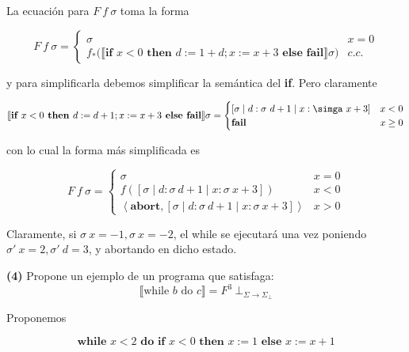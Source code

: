 \documentclass[a4paper, 12pt]{article}
\begin{document}
La ecuación para $F ~ f ~ \sigma$ toma la forma 

\begin{equation*}
  F ~ f ~ \sigma = \begin{cases}
    \sigma & x = 0 \\ 
    f_* \big( \llbracket \textbf{if } x < 0 \textbf{ then } d := 1 + d; x := x +
  3\textbf{ else } \textbf{fail} \rrbracket\sigma \big) & c.c.
  \end{cases}
\end{equation*}

y para simplificarla debemos simplificar la semántica del \textbf{if}. Pero
claramente 

\begin{equation*}
  \llbracket \textbf{if } x < 0 \textbf{ then } d := d + 1; x := x+3 \textbf{
  else } \textbf{fail} \rrbracket\sigma = \begin{cases}
    [\sigma \mid d : \sigma ~ d +1 \mid x : \simga ~ x + 3] & x < 0 \\ 
    \textbf{fail} & x \geq 0
  \end{cases}
\end{equation*}

con lo cual  la forma más simplificada es

\begin{equation*}
  F ~ f ~ \sigma = \begin{cases}
    \sigma & x = 0 \\ 
    f\left( [\sigma \mid d : \sigma ~ d + 1 \mid x : \sigma ~ x + 3] \right) & x
    < 0 \\ 
    \left<\textbf{abort}, [\sigma \mid d : \sigma ~ d + 1 \mid x : \sigma ~ x +
    3] \right> & x > 0
  \end{cases}
\end{equation*}


Claramente, si $\sigma ~ x = -1, \sigma ~ x = -2$, el while se ejecutará una vez
poniendo $\sigma'~ x = 2, \sigma'~d = 3$, y abortando en dicho estado.

\pagebreak


\begin{myframe}
    \textbf{(4)} Propone un ejemplo de un programa que satisfaga:
    \[
      \llbracket \text{while } b \text{ do } c \rrbracket = F^{3} ~ {\bot_{\Sigma
      \to \Sigma_\bot }}
    \]
\end{myframe}


Proponemos

\begin{equation*}
  \textbf{while } x < 2 \textbf{ do } \textbf{if } x < 0 \textbf{ then } x := 1
  \textbf{ else } x := x + 1
\end{equation*}
\end{document}
